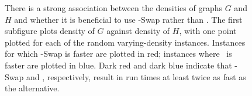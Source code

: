 \begin{figure}[htb]
    \centering
    \caption{There is a strong association between the densities of graphs $G$ and $H$
        and whether it is beneficial to use \McSplit-Swap rather than \McSplit.
        The first subfigure plots density of $G$ against density of $H$, with one point
        plotted for each of the random varying-density instances.  Instances for which \McSplit-Swap
        is faster are plotted in red; instances where \McSplit\ is faster
        are plotted in blue.  Dark red and dark blue indicate that \McSplit-Swap and \McSplit,
        respectively, result in run times at least twice as fast as the alternative.}
        \label{figure:coloured-scatter-mcis-run-times}
\end{figure}

